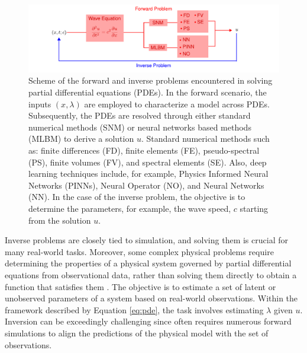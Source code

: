 \documentclass[11pt,twoside]{article}
\begin{document}
\begin{figure}[H]
\includegraphics{figs/Forward_Inverse_Modeling_Waves.pdf}
    \caption{Scheme of the forward and inverse problems encountered in solving partial differential equations (PDEs). In the forward 
    scenario, the inputs $(x,\lambda)$ are employed to characterize a model across PDEs. Subsequently, the PDEs are resolved through 
    either standard numerical methods (SNM) or neural networks based methods (MLBM) to derive a solution $u$. Standard numerical 
    methods such as: finite differences (FD), finite elements (FE), pseudo-spectral (PS), finite volumes (FV), and spectral 
    elements (SE). Also, deep learning techniques include, for example, Physics Informed Neural Networks (PINNs), Neural Operator 
    (NO), and Neural Networks (NN). In the case of the inverse problem, the objective is to determine the parameters, for example, 
    the wave speed, $c$ starting from the solution $u$.}
    \label{fig:forward_inverse}
\end{figure}

Inverse problems are closely tied to simulation, and solving them is crucial for many real-world tasks. Moreover, some complex physical 
problems require determining the properties of a physical system governed by partial differential equations from observational data, 
rather than solving them directly to obtain a function that satisfies them 
\citep{galiounas_battery_2022, ren_seismicnet_2024,mccann_convolutional_2017}. The objective is to estimate a set of latent or 
unobserved parameters of a system based on real-world observations. Within the framework described by Equation \ref{eq:pde}, 
the task involves estimating $\lambda$ given $u$. Inversion can be exceedingly challenging since often requires numerous forward 
simulations to align the predictions of the physical model with the set of observations. 



\end{document}

